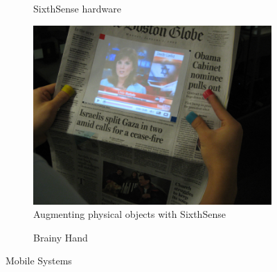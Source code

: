 \begin{figure}
        \centering
        \begin{subfigure}[b]{0.3\textwidth}
               \def\svgwidth{\textwidth}
               {\selectfont {sithsense.pdf_tex}}
                \caption{SixthSense hardware\newline}
                \label{img:sixSetup}
        \end{subfigure}
         \quad %
        \begin{subfigure}[b]{0.3\textwidth}
                \includegraphics[width=\textwidth]{images/relatedwork/sixthsense02.jpg}
                \caption{Augmenting physical objects with SixthSense }
                \label{img:sixAugmented}
        \end{subfigure}
         \quad%
        \begin{subfigure}[b]{0.3\textwidth}
        \setlength\fboxsep{0pt}
                \caption{Brainy Hand\newline}
                \label{img:bainyhand}
        \end{subfigure}
        \caption{Mobile Systems}\label{fig:animals}
\end{figure}

